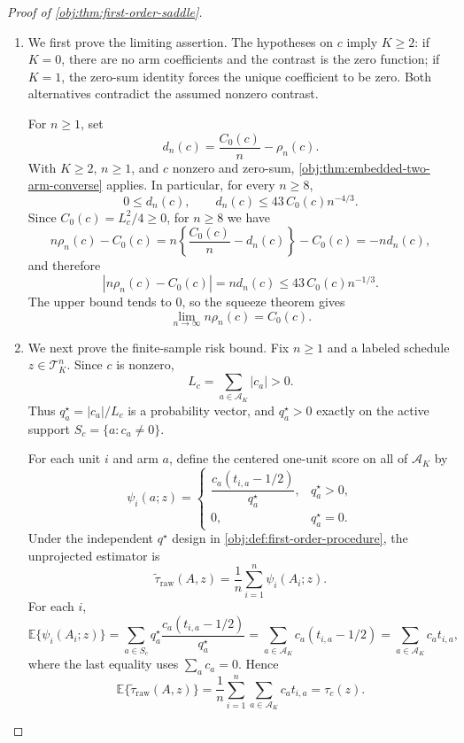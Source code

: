 \begin{proof}[Proof of \cref{obj:thm:first-order-saddle}]
\begin{enumerate}
\item We first prove the limiting assertion. The hypotheses on \(c\) imply \(K\ge 2\): if \(K=0\), there are no arm coefficients and the contrast is the zero function; if \(K=1\), the zero-sum identity forces the unique coefficient to be zero. Both alternatives contradict the assumed nonzero contrast. %

For \(n\ge 1\), set
\[
d_n(c)=\frac{C_0(c)}{n}-\rho_n(c).
\]
With \(K\ge 2\), \(n\ge 1\), and \(c\) nonzero and zero-sum, \cref{obj:thm:embedded-two-arm-converse} applies. In particular, for every \(n\ge 8\),
\[
0\le d_n(c),
\qquad
d_n(c)\le 43\,C_0(c)n^{-4/3}.
\]
Since \(C_0(c)=L_c^2/4\ge 0\), for \(n\ge 8\) we have
\[
n\rho_n(c)-C_0(c)
=
n\left\{\frac{C_0(c)}{n}-d_n(c)\right\}-C_0(c)
=
-nd_n(c),
\]
and therefore
\[
\left|n\rho_n(c)-C_0(c)\right|
=
nd_n(c)
\le
43\,C_0(c)n^{-1/3}.
\]
The upper bound tends to \(0\), so the squeeze theorem gives
\[
\lim_{n\to\infty} n\rho_n(c)=C_0(c).
\]

\item We next prove the finite-sample risk bound. Fix \(n\ge 1\) and a labeled schedule \(z\in\mathcal T_K^n\). Since \(c\) is nonzero,
\[
L_c=\sum_{a\in\mathcal A_K}|c_a|>0.
\]
Thus \(q_a^\star=|c_a|/L_c\) is a probability vector, and \(q_a^\star>0\) exactly on the active support \(S_c=\{a:c_a\ne0\}\).

For each unit \(i\) and arm \(a\), define the centered one-unit score on all of \(\mathcal A_K\) by
\[
\psi_i(a;z)=
\begin{cases}
\dfrac{c_a(t_{i,a}-1/2)}{q_a^\star}, & q_a^\star>0,\\[1.2ex]
0, & q_a^\star=0.
\end{cases}
\]
Under the independent \(q^\star\) design in \cref{obj:def:first-order-procedure}, the unprojected estimator is
\[
\widetilde\tau_{\mathrm{raw}}(A,z)
=
\frac1n\sum_{i=1}^n \psi_i(A_i;z).
\]
For each \(i\),
\[
\mathbb E\{\psi_i(A_i;z)\}
=
\sum_{a\in S_c} q_a^\star
\frac{c_a(t_{i,a}-1/2)}{q_a^\star}
=
\sum_{a\in\mathcal A_K} c_a(t_{i,a}-1/2)
=
\sum_{a\in\mathcal A_K} c_a t_{i,a},
\]
where the last equality uses \(\sum_a c_a=0\). Hence
\[
\mathbb E\{\widetilde\tau_{\mathrm{raw}}(A,z)\}
=
\frac1n\sum_{i=1}^n\sum_{a\in\mathcal A_K}c_at_{i,a}
=
\tau_c(z).
\]


\end{enumerate}
\end{proof}
